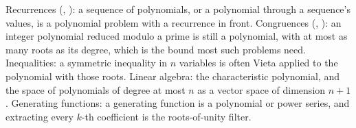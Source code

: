 \begin{hides}
Recurrences (, ): a sequence of polynomials, or a polynomial through a sequence's values, is a polynomial problem with a recurrence in front. Congruences (, ): an integer polynomial reduced modulo a prime is still a polynomial, with at most as many roots as its degree, which is the bound most such problems need. Inequalities: a symmetric inequality in $n$ variables is often Vieta applied to the polynomial with those roots. Linear algebra: the characteristic polynomial, and the space of polynomials of degree at most $n$ as a vector space of dimension $n + 1$. Generating functions: a generating function is a polynomial or power series, and extracting every $k$-th coefficient is the roots-of-unity filter.
\end{hides}

